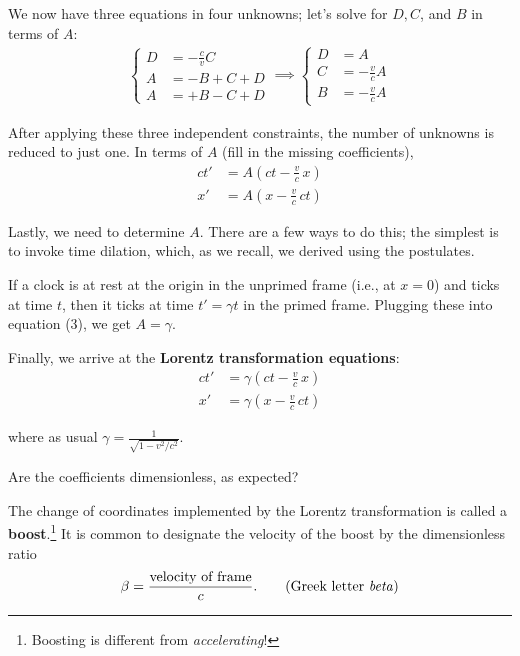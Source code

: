 \documentclass[11pt, letterpaper, openany]{book}
\newenvironment{exercise}[1][Exercise]{%
  \tcolorbox[blanker, breakable, left=1em,
    before skip=1em, after skip=1em,
    borderline west={3pt}{0pt}{PhysNavy},
    colback=PhysCream,
    before upper={\textcolor{PhysNavy}{\sffamily\bfseries #1:}\space}
  ]%
}{%
  \endtcolorbox%
}
\begin{document}
We now have three equations in four unknowns; let's solve for $D, C$, and $B$ in terms of $A$:
\begin{align*}
    \begin{cases}
    D &= - \frac{c}{v} C \\
    A &= -B + C + D \\
    A &= +B - C + D 
    \end{cases}
    \implies
    \begin{cases}
    D &= A \\
    C &= -\frac{v}{c} A \\
    B &= -\frac{v}{c} A
    \end{cases}
\end{align*}

After applying these three independent constraints, the number of unknowns is reduced to just one. In terms of $A$ (fill in the missing coefficients),
\begin{align}
    ct' &= A \left( ct - \frac{v}{c} \, x \right) \tag{3} \\
    x'  &= A \left( x - \frac{v}{c} \, ct \right) \tag{4}
\end{align}

Lastly, we need to determine $A$. There are a few ways to do this; the simplest is to invoke time dilation, which, as we recall, we derived using the postulates.

\begin{exercise}[Exercise 7]
If a clock is at rest at the origin in the unprimed frame (i.e., at $x=0$) and ticks at time $t$, then it ticks at time $t' = \gamma t$ in the primed frame. Plugging these into equation (3), we get $A = \gamma$.
\end{exercise}

Finally, we arrive at the \textbf{Lorentz transformation equations}:
\begin{align*}
    ct' &= \gamma \left( ct - \frac{v}{c} \, x \right) \\
    x'  &= \gamma \left( x - \frac{v}{c} \, ct \right)
\end{align*}

where as usual $\gamma = \frac{1}{\sqrt{1-v^2/c^2}}$.

\begin{exercise}[Quick Check]
Are the coefficients dimensionless, as expected?
\end{exercise}

The change of coordinates implemented by the Lorentz transformation is called a \textbf{boost}.\footnote{Boosting is different from \textit{accelerating}!} It is common to designate the velocity of the boost by the dimensionless ratio
\[ \beta = \frac{\text{velocity of frame}}{c}. \tag*{(\text{Greek letter \textit{beta}})} \]
\end{document}
